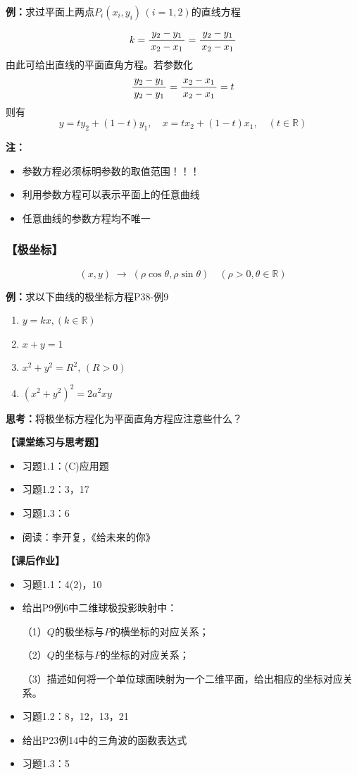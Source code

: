 {\bf 例：}求过平面上两点$P_i(x_i,y_i)\,(i=1,2)$的直线方程
		  
$$k=\displaystyle\frac{\,{y_2-y_1}\,}{\,{x_2-x_1}\,}=\displaystyle\frac{\,{y_2-y_1}\,}{\,{x_2-x_1}\,}$$
由此可给出直线的平面直角方程。若参数化
$$\displaystyle\frac{\,{y_2-y_1}\,}{\,{y_2-y_1}\,}=\displaystyle\frac{\,{x_2-x_1}\,}{\,{x_2-x_1}\,}=t$$
则有
$$y=ty_2+(1-t)y_1,\quad x=tx_2+(1-t)x_1,\quad (t\in\mathbb{R})$$
		  
{\bf 注：}
\begin{itemize}
  \item 参数方程必须标明参数的取值范围！！！
  \item {利用参数方程可以表示平面上的任意曲线}
  \item {任意曲线的参数方程均不唯一}
\end{itemize}

\subsubsection{【极坐标】}

$$(x,y)\;\to\;(\rho\cos\theta,\rho\sin\theta)\quad
(\rho>0,\theta\in\mathbb{R})$$
	
{{\bf 例：}求以下曲线的极坐标方程\hfill P38-例9}
		
\begin{enumerate}
  \item $y=kx,(k\in\mathbb{R})$
  \item $x+y=1$
  \item $x^2+y^2=R^2,\,(R>0)$
  \item $(x^2+y^2)^2=2a^2xy$
\end{enumerate}
	
{\bf 思考：}将极坐标方程化为平面直角方程应注意些什么？

\vspace{4em}

{\bf 【课堂练习与思考题】}

\begin{itemize}
  \item 习题1.1：(C)应用题
  \item 习题1.2：3，17
  \item 习题1.3：6
  \item 阅读：李开复，《给未来的你》
\end{itemize}

{\bf 【课后作业】}
	
\begin{itemize}
  \item 习题1.1：4(2)，10
  \item 给出P9例6中二维球极投影映射中：
  
  （1）$Q$的极坐标与$P$的横坐标的对应关系；
  
  （2）$Q$的坐标与$P$的坐标的对应关系；
  
  （3）描述如何将一个单位球面映射为一个二维平面，给出相应的坐标对应关系。
  \item 习题1.2：8，12，13，21
  \item 给出P23例14中的三角波的函数表达式
  \item 习题1.3：5
\end{itemize}